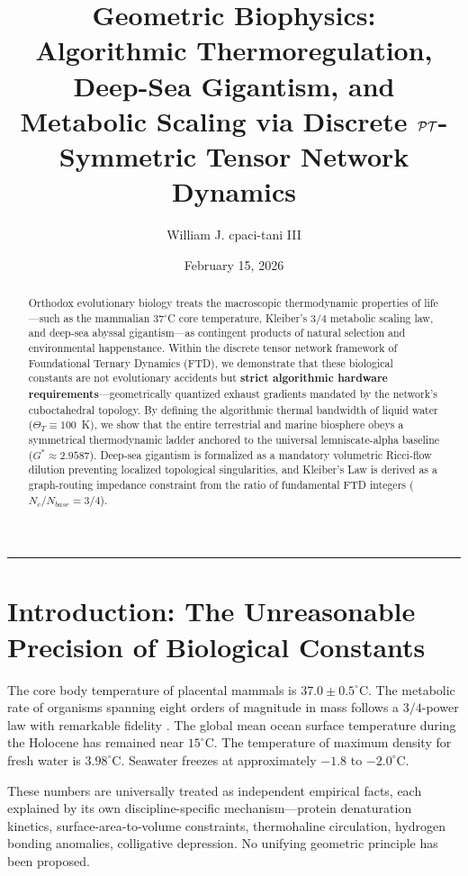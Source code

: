 \documentclass[11pt, letterpaper]{article}
\title{\vspace{-3em}\textbf{Geometric Biophysics:\\ \large Algorithmic Thermoregulation, Deep-Sea Gigantism, and Metabolic Scaling via Discrete $\mathcal{PT}$-Symmetric Tensor Network Dynamics}}
\author[1]{William J. cpaci-tani III}
\affil[1]{\textit{Foundational Ternary Dynamics Research}}
\date{February 15, 2026}
\newcommand{\G}{G^*}
\theoremstyle{definition}
\theoremstyle{remark}
\begin{document}
\maketitle

\begin{abstract}
Orthodox evolutionary biology treats the macroscopic thermodynamic properties of life---such as the mammalian $37^\circ$C core temperature, Kleiber's $3/4$ metabolic scaling law, and deep-sea abyssal gigantism---as contingent products of natural selection and environmental happenstance. Within the discrete tensor network framework of Foundational Ternary Dynamics (FTD), we demonstrate that these biological constants are not evolutionary accidents but \textbf{strict algorithmic hardware requirements}---geometrically quantized exhaust gradients mandated by the network's cuboctahedral topology. By defining the algorithmic thermal bandwidth of liquid water ($\Theta_T \equiv 100$~K), we show that the entire terrestrial and marine biosphere obeys a symmetrical thermodynamic ladder anchored to the universal lemniscate-alpha baseline ($\G \approx 2.9587$). Deep-sea gigantism is formalized as a mandatory volumetric Ricci-flow dilution preventing localized topological singularities, and Kleiber's Law is derived as a graph-routing impedance constraint from the ratio of fundamental FTD integers ($N_c / N_{base} = 3/4$).
\end{abstract}

\vspace{1em}
\hrule
\vspace{1.5em}

\section{Introduction: The Unreasonable Precision of Biological Constants}

The core body temperature of placental mammals is $37.0 \pm 0.5^\circ$C. The metabolic rate of organisms spanning eight orders of magnitude in mass follows a $3/4$-power law with remarkable fidelity \cite{Kleiber1932}. The global mean ocean surface temperature during the Holocene has remained near $15^\circ$C. The temperature of maximum density for fresh water is $3.98^\circ$C. Seawater freezes at approximately $-1.8$ to $-2.0^\circ$C.

These numbers are universally treated as independent empirical facts, each explained by its own discipline-specific mechanism---protein denaturation kinetics, surface-area-to-volume constraints, thermohaline circulation, hydrogen bonding anomalies, colligative depression. No unifying geometric principle has been proposed.
\end{document}
